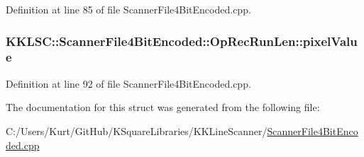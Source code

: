 Definition at line 85 of file Scanner\+File4\+Bit\+Encoded.\+cpp.

\subsubsection[{\texorpdfstring{pixel\+Value}{pixelValue}}]{ K\+K\+L\+S\+C\+::\+Scanner\+File4\+Bit\+Encoded\+::\+Op\+Rec\+Run\+Len\+::pixel\+Value}\hypertarget{struct_scanner_file4_bit_encoded_1_1_op_rec_run_len_aa452bd8fc82a219e22451aa88c3222c3}{}\label{struct_scanner_file4_bit_encoded_1_1_op_rec_run_len_aa452bd8fc82a219e22451aa88c3222c3}


Definition at line 92 of file Scanner\+File4\+Bit\+Encoded.\+cpp.



The documentation for this struct was generated from the following file\+:\begin{DoxyCompactItemize}
\item 
C\+:/\+Users/\+Kurt/\+Git\+Hub/\+K\+Square\+Libraries/\+K\+K\+Line\+Scanner/\hyperlink{_scanner_file4_bit_encoded_8cpp}{Scanner\+File4\+Bit\+Encoded.\+cpp}\end{DoxyCompactItemize}
